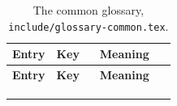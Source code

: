 \makeatletter
\newcommand*{\tdk@abbrrows}{}\newcommand*{\tdk@symrows}{}\newcommand*{\tdk@termrows}{}
\newcommand{\tdk@abbrrow}[1]{\Glsentrylong{#1} (\glsentryshort{#1}) & \texttt{#1} & \glsentryuseri{#1}. \\}
\newcommand{\tdk@symrow}[1]{\glsentryname{#1} & \texttt{#1} & \glsentrydesc{#1}. \\}
\newcommand{\tdk@termrow}[1]{\Glsentryname{#1} & \texttt{#1} & \glsentrydesc{#1}. \\}
\newcommand{\tdk@sortcommon}[1]{%
  \edef\tdk@type{\glsentrytype{#1}}%
  \ifdefstring{\tdk@type}{abbreviations}{\gappto\tdk@abbrrows{\tdk@abbrrow{#1}}}{%
    \ifdefstring{\tdk@type}{symbols}{\gappto\tdk@symrows{\tdk@symrow{#1}}}{\gappto\tdk@termrows{\tdk@termrow{#1}}}}}
\forlistloop{\tdk@sortcommon}{\tdkcommonkeys}
{\small
\begin{xltabular}{\linewidth}{>{\raggedright\arraybackslash}p{0.27\linewidth} l X}
  \caption{The common glossary, \texttt{include/glossary-common.tex}.}\label{tab:glossary-common}\\
  \toprule \textbf{Entry} & \textbf{Key} & \textbf{Meaning} \\ \midrule \endfirsthead
  \toprule \textbf{Entry} & \textbf{Key} & \textbf{Meaning} \\ \midrule \endhead
  \bottomrule \endlastfoot
   \\
  \tdk@abbrrows \midrule
   \\
  \tdk@symrows \midrule
   \\
  \tdk@termrows
\end{xltabular}
}
\makeatother

